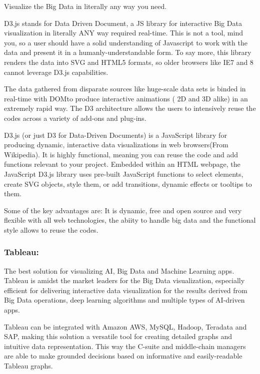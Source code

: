 \documentclass[]{book}
\theoremstyle{definition}
\theoremstyle{definition}
\theoremstyle{definition}
\theoremstyle{remark}
\begin{document}
Visualize the Big Data in literally any way you need.

D3.js stands for Data Driven Document, a JS library for interactive Big
Data visualization in literally ANY way required real-time. This is not
a tool, mind you, so a user should have a solid understanding of
Javascript to work with the data and present it in a
humanly-understandable form. To say more, this library renders the data
into SVG and HTML5 formats, so older browsers like IE7 and 8 cannot
leverage D3.js capabilities.

The data gathered from disparate sources like huge-scale data sets is
binded in real-time with DOMto produce interactive animations ( 2D and
3D alike) in an extremely rapid way. The D3 architecture allows the
users to intensively reuse the codes across a variety of add-ons and
plug-ins.

D3.js (or just D3 for Data-Driven Documents) is a JavaScript library for
producing dynamic, interactive data visualizations in web browsers(From
Wikipedia). It is highly functional, meaning you can reuse the code and
add functions relevant to your project. Embedded within an HTML webpage,
the JavaScript D3.js library uses pre-built JavaScript functions to
select elements, create SVG objects, style them, or add transitions,
dynamic effects or tooltips to them.

Some of the key advantages are: It is dynamic, free and open source and
very flexible with all web technologies, the abiity to handle big data
and the functional style allows to reuse the codes.

\citep{d3_interactive_viz}

\subsubsection{Tableau:}\label{tableau}

The best solution for visualizing AI, Big Data and Machine Learning
apps. Tableau is amidst the market leaders for the Big Data
visualization, especially efficient for delivering interactive data
visualization for the results derived from Big Data operations, deep
learning algorithms and multiple types of AI-driven apps.

Tableau can be integrated with Amazon AWS, MySQL, Hadoop, Teradata and
SAP, making this solution a versatile tool for creating detailed graphs
and intuitive data representation. This way the C-suite and middle-chain
managers are able to make grounded decisions based on informative and
easily-readable Tableau graphs.
\end{document}
